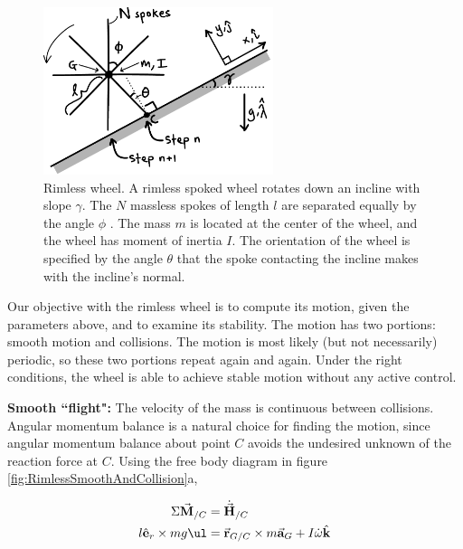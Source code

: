 \begin{figure}[h]		%
\begin{centering}
\includegraphics[width=0.6\textwidth]{Figures/RimlessWheel}\par
\end{centering}
\caption[Diagram: Rimless Wheel]{Rimless wheel. A rimless spoked wheel rotates
down an incline with slope $\gamma$. The $N$ massless spokes of length $l$ are
separated equally by the angle $\phi$ . The mass $m$ is located at the center of
the wheel, and the wheel has moment of inertia $I$. The orientation of the
wheel is specified by the angle $\theta$ that the spoke contacting the incline
makes with the incline's normal.}
\label{fig:RimlessWheel}
\end{figure}
%

Our objective with the rimless wheel is to compute its motion, given the
parameters above, and to examine its stability. The motion has two portions:
smooth motion and collisions.  The motion is most likely (but not necessarily)
periodic, so these two portions repeat again and again. Under the right
conditions, the wheel is able to achieve stable motion without any active
control.

\textbf{Smooth ``flight":} The velocity of the mass is continuous between
collisions. Angular momentum balance is a natural choice for finding the
motion, since angular momentum balance about point $C$ avoids the
undesired unknown of the reaction force at $C$. Using the free body diagram in
figure \ref{fig:RimlessSmoothAndCollision}a,

\begin{align}
\Sigma \vec{\mathbf{M}}_{/C} &= \dot{\vec{\mathbf{H}}}_{/C} \notag \\
l \hat{\mathbf{e}}_r \times mg \ul &= \vec{\mathbf{r}}_{G/C} \times m\vec{\mathbf{a}}_G + I \dot{\omega} \hat{\mathbf{k}}
\label{eq:RimlessAMB}
\end{align}

